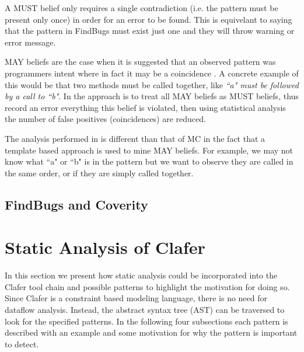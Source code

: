 \documentclass[10pt,oneside]{IEEEtran}
\begin{document}
A MUST belief only requires a single contradiction (i.e. the pattern must be present only once) in order for an error to be found. This is equivelant to saying that the pattern in FindBugs must exist just one and they will throw warning or error message.

MAY beliefs are the case when it is suggested that an observed pattern was programmers intent where in fact it may be a coincidence \cite{7}. A concrete example of this would be that two methods must be called together, like \textit{``a" must be followed by a call to ``b"}. In \cite{7} the approach is to treat all MAY beliefs as MUST beliefs, thus record an error everything this belief is violated, then using statistical analysis the number of false positives (coincidences) are reduced.

The analysis performed in \cite{7} is different than that of MC in the fact that a template based approach is used to mine MAY beliefs. For example, we may not know what ``a" or ``b" is in the pattern but we want to observe they are called in the same order, or if they are simply called together.

\subsection{FindBugs and Coverity}


\section{Static Analysis of Clafer}
In this section we present how static analysis could be incorporated into the Clafer tool chain and possible patterns to highlight the motivation for doing so. Since Clafer is a constraint based modeling language, there is no need for dataflow analysis. Instead, the abstract syntax tree (AST) can be traversed to look for the specified patterns. In the following four subsections each pattern is described with an example and some motivation for why the pattern is important to detect. %
\end{document}
